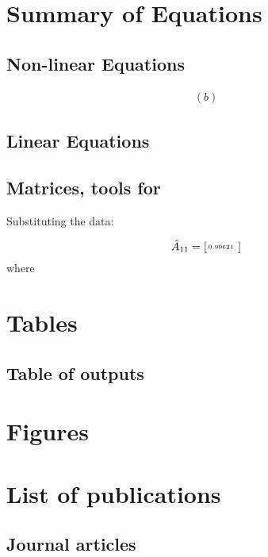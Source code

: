 \chapter{Summary of Equations}

\section{Non-linear Equations}



\begin{equation}\label{App1}
\begin{array}{c}

(b)
    \end{array}
\end{equation}


\section{Linear Equations}


\section{Matrices, tools for }
Substituting the data:

\[
\hat{A}_{11} = 
 \tiny 
\setlength{\arraycolsep}{1.32pt} \left[
\begin{array}{cccccccccccc}
0.99621 &
\end{array}\right]
\]
where 




\chapter{Tables}


\section{Table of outputs}




\chapter{Figures}






\chapter{List of publications} \label{ch:vita}

\section{Journal articles} 

    


